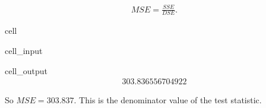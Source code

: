 \documentclass[letterpaper,10pt,english]{jupyterBook}
\begin{document}
\begin{equation*}
\begin{split} MSE = \frac{SSE}{DSE}. \end{split}
\end{equation*}
\begin{sphinxuseclass}{cell}\begin{sphinxVerbatimInput}

\begin{sphinxuseclass}{cell_input}
\begin{sphinxVerbatim}[commandchars=\\\{\}]

\end{sphinxVerbatim}

\end{sphinxuseclass}\end{sphinxVerbatimInput}
\begin{sphinxVerbatimOutput}

\begin{sphinxuseclass}{cell_output}\begin{equation*}
\begin{split}303.836556704922\end{split}
\end{equation*}
\end{sphinxuseclass}\end{sphinxVerbatimOutput}

\end{sphinxuseclass}
\sphinxAtStartPar
So \(MSE = 303.837\). This is the denominator value of the test statistic.
\end{document}
